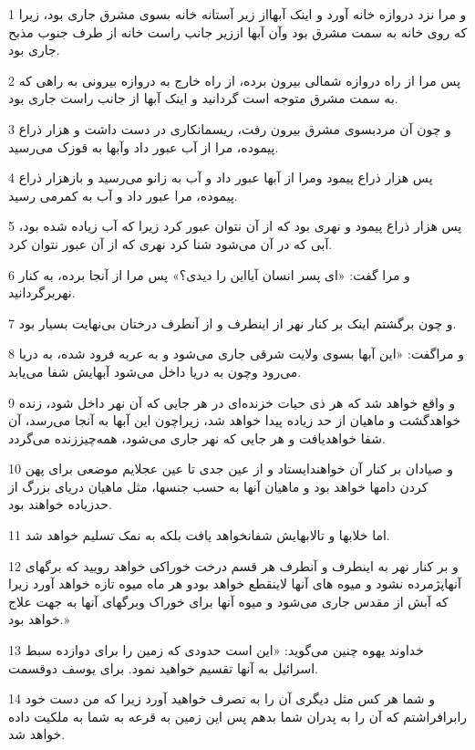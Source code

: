 \par 1 و مرا نزد دروازه خانه آورد و اینک آبهااز زیر آستانه خانه بسوی مشرق جاری بود، زیرا که روی خانه به سمت مشرق بود وآن آبها اززیر جانب راست خانه از طرف جنوب مذبح جاری بود.
\par 2 پس مرا از راه دروازه شمالی بیرون برده، از راه خارج به دروازه بیرونی به راهی که به سمت مشرق متوجه است گردانید و اینک آبها از جانب راست جاری بود.
\par 3 و چون آن مردبسوی مشرق بیرون رفت، ریسمانکاری در دست داشت و هزار ذراع پیموده، مرا از آب عبور داد وآبها به قوزک می‌رسید.
\par 4 پس هزار ذراع پیمود ومرا از آبها عبور داد و آب به زانو می‌رسید و بازهزار ذراع پیموده، مرا عبور داد و آب به کمرمی رسید.
\par 5 پس هزار ذراع پیمود و نهری بود که از آن نتوان عبور کرد زیرا که آب زیاده شده بود، آبی که در آن می‌شود شنا کرد نهری که از آن عبور نتوان کرد.
\par 6 و مرا گفت: «ای پسر انسان آیااین را دیدی؟» پس مرا از آنجا برده، به کنار نهربرگردانید.
\par 7 و چون برگشتم اینک بر کنار نهر از اینطرف و از آنطرف درختان بی‌نهایت بسیار بود.
\par 8 و مراگفت: «این آبها بسوی ولایت شرقی جاری می‌شود و به عربه فرود شده، به دریا می‌رود وچون به دریا داخل می‌شود آبهایش شفا می‌یابد.
\par 9 و واقع خواهد شد که هر ذی حیات خزنده‌ای در هر جایی که آن نهر داخل شود، زنده خواهدگشت و ماهیان از حد زیاده پیدا خواهد شد، زیراچون این آبها به آنجا می‌رسد، آن شفا خواهدیافت و هر جایی که نهر جاری می‌شود، همه‌چیززنده می‌گردد.
\par 10 و صیادان بر کنار آن خواهندایستاد و از عین جدی تا عین عجلایم موضعی برای پهن کردن دامها خواهد بود و ماهیان آنها به حسب جنسها، مثل ماهیان دریای بزرگ از حدزیاده خواهند بود.
\par 11 اما خلابها و تالابهایش شفانخواهد یافت بلکه به نمک تسلیم خواهد شد.
\par 12 و بر کنار نهر به اینطرف و آنطرف هر قسم درخت خوراکی خواهد رویید که برگهای آنهاپژمرده نشود و میوه های آنها لاینقطع خواهد بودو هر ماه میوه تازه خواهد آورد زیرا که آبش از مقدس جاری می‌شود و میوه آنها برای خوراک وبرگهای آنها به جهت علاج خواهد بود.»
\par 13 خداوند یهوه چنین می‌گوید: «این است حدودی که زمین را برای دوازده سبط اسرائیل به آنها تقسیم خواهید نمود. برای یوسف دوقسمت.
\par 14 و شما هر کس مثل دیگری آن را به تصرف خواهید آورد زیرا که من دست خود رابرافراشتم که آن را به پدران شما بدهم پس این زمین به قرعه به شما به ملکیت داده خواهد شد.
